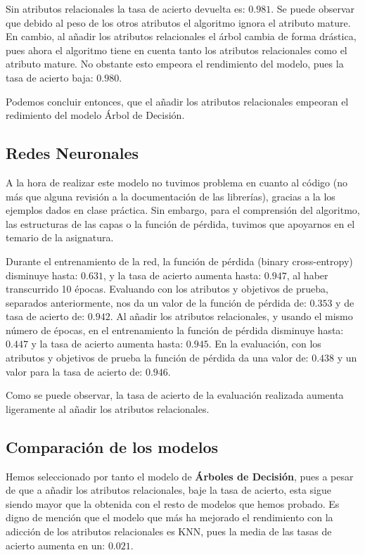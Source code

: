 \documentclass[conference,a4paper]{IEEEtran}
\begin{document}
Sin atributos relacionales la tasa de acierto devuelta es: $0.981$. Se puede observar que debido al peso de los otros atributos el algoritmo ignora el atributo mature. En cambio, al añadir los atributos relacionales el árbol cambia de forma drástica, pues ahora el algoritmo tiene en cuenta tanto los atributos relacionales como el atributo mature. No obstante esto empeora el rendimiento del modelo, pues la tasa de acierto baja: $0.980$.

 Podemos concluir entonces, que el añadir los atributos relacionales empeoran el redimiento del modelo Árbol de Decisión.

\subsection{Redes Neuronales}

A la hora de realizar este modelo no tuvimos problema en cuanto al código (no más que alguna revisión a la documentación de las librerías), gracias a la los ejemplos dados en clase práctica. Sin embargo, para el comprensión del algoritmo, las estructuras de las capas o la función de pérdida, tuvimos que apoyarnos en el temario de la asignatura.

Durante el entrenamiento de la red, la función de pérdida (binary cross-entropy) disminuye hasta: $0.631$, y la tasa de acierto aumenta hasta: $0.947$, al haber transcurrido 10 épocas. Evaluando con los atributos y objetivos de prueba, separados anteriormente, nos da un valor de la función de pérdida de: $0.353$ y de tasa de acierto de: $0.942$. Al añadir los atributos relacionales, y usando el mismo número de épocas, en el entrenamiento la función de pérdida disminuye hasta: $0.447$ y la tasa de acierto aumenta hasta: $0.945$. En la evaluación, con los atributos y objetivos de prueba la función de pérdida da una valor de: $0.438$ y un valor para la tasa de acierto de: $0.946$.  

Como se puede observar, la tasa de acierto de la evaluación realizada aumenta ligeramente al añadir los atributos relacionales.

\subsection{Comparación de los modelos}

Hemos seleccionado por tanto el modelo de \textbf{Árboles de Decisión}, pues a pesar de que a añadir los atributos relacionales, baje la tasa de acierto, esta sigue siendo mayor que la obtenida con el resto de modelos que hemos probado. Es digno de mención que el modelo que más ha mejorado el rendimiento con la adicción de los atributos relacionales es KNN, pues la media de las tasas de acierto aumenta en un: $0.021$.
\end{document}
